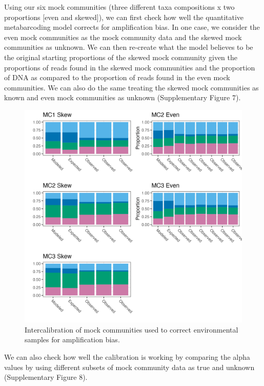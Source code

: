 \documentclass[
]{article}
\begin{document}
Using our six mock communities (three different taxa compositions x two
proportions {[}even and skewed{]}), we can first check how well the
quantitative metabarcoding model corrects for amplification bias. In one
case, we consider the even mock communities as the mock community data
and the skewed mock communities as unknown. We can then re-create what
the model believes to be the original starting proportions of the skewed
mock community given the proportions of reads found in the skewed mock
communities and the proportion of DNA as compared to the proportion of
reads found in the even mock communities. We can also do the same
treating the skewed mock communities as known and even mock communities
as unknown (Supplementary Figure 7).

\begin{figure}
\centering
\includegraphics{../Output/SupplementalFigures/mock_internal_calibration.png}
\caption{Intercalibration of mock communities used to correct
environmental samples for amplification bias.}
\end{figure}

We can also check how well the calibration is working by comparing the
alpha values by using different subsets of mock community data as true
and unknown (Supplementary Figure 8).
\end{document}
